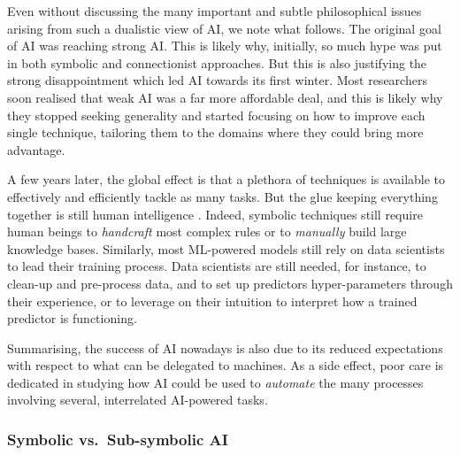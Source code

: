 \documentclass[12pt,a4paper,openright,twoside]{book}
\begin{document}
Even without discussing the many important and subtle philosophical issues arising from such a dualistic view of AI, we note what follows.
%
The original goal of AI was reaching strong AI.
%
This is likely why, initially, so much hype was put in both symbolic and connectionist approaches.
%
But this is also justifying the strong disappointment which led AI towards its first winter.
%
Most researchers soon realised that weak AI was a far more affordable deal, and this is likely why they stopped seeking generality and started focusing on how to improve each single technique, tailoring them to the domains where they could bring more advantage.

A few years later, the global effect is that a plethora of techniques is available to effectively and efficiently tackle as many tasks.
%
But the glue keeping everything together is still human intelligence \cite{Yao2018}.
%
Indeed, symbolic techniques still require human beings to \emph{handcraft} most complex rules or to \emph{manually} build large knowledge bases.
%
Similarly, most ML-powered models still rely on data scientists to lead their training process.
%
Data scientists are still needed, for instance, to clean-up and pre-process data, and to set up predictors hyper-parameters through their experience, or to leverage on their intuition to interpret how a trained predictor is functioning.

Summarising, the success of AI nowadays is also due to its reduced expectations with respect to what can be delegated to machines.
%
As a side effect, poor care is dedicated in studying how AI could be used to \emph{automate} the many processes involving several, interrelated AI-powered tasks.

\subsubsection{Symbolic vs.\ Sub-symbolic AI}
\end{document}
